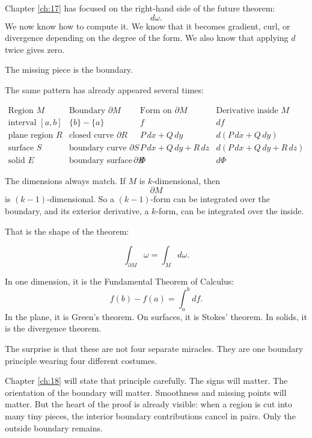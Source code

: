 Chapter \ref{ch:17} has focused on the right-hand side of the future theorem:
\[
    d\omega.
\]
We now know how to compute it.  We know that it becomes gradient, curl, or divergence
depending on the degree of the form.  We also know that applying \(d\) twice gives zero.

The missing piece is the boundary.

The same pattern has already appeared several times:

\[
\begin{array}{c|c|c|c}
\text{Region }M & \text{Boundary }\partial M
& \text{Form on }\partial M & \text{Derivative inside }M \\ \hline
\text{interval }[a,b] &
\{b\}-\{a\} &
f &
df
\\[1mm]
\text{plane region }R &
\text{closed curve }\partial R &
P\,dx+Q\,dy &
d(P\,dx+Q\,dy)
\\[1mm]
\text{surface }S &
\text{boundary curve }\partial S &
P\,dx+Q\,dy+R\,dz &
d(P\,dx+Q\,dy+R\,dz)
\\[1mm]
\text{solid }E &
\text{boundary surface }\partial E &
\Phi &
d\Phi
\end{array}
\]

The dimensions always match.  If \(M\) is \(k\)-dimensional, then
\[
    \partial M
\]
is \((k-1)\)-dimensional.  So a \((k-1)\)-form can be integrated over the boundary,
and its exterior derivative, a \(k\)-form, can be integrated over the inside.

That is the shape of the theorem:

\[
\boxed{
    \int_{\partial M}\omega=\int_M d\omega.
}
\]

In one dimension, it is the Fundamental Theorem of Calculus:
\[
    f(b)-f(a)=\int_a^b df.
\]
In the plane, it is Green's theorem.  On surfaces, it is Stokes' theorem.  In solids, it
is the divergence theorem.

The surprise is that these are not four separate miracles.  They are one boundary
principle wearing four different costumes.

Chapter \ref{ch:18} will state that principle carefully.  The signs will matter.  The
orientation of the boundary will matter.  Smoothness and missing points will matter.
But the heart of the proof is already visible: when a region is cut into many tiny pieces,
the interior boundary contributions cancel in pairs.  Only the outside boundary remains.

